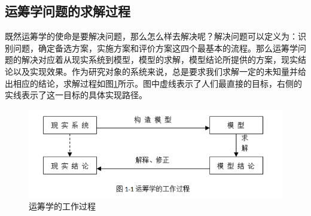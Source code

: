 \subsection{运筹学问题的求解过程}
\begin{frame}{\subsecname}
    既然运筹学的使命是要解决问题，那么怎么样去解决呢？解决问题可以定义为：识别问题，确定备选方案，实施方案和评价方案这四个最基本的流程。那么运筹学问题的解决对应着从现实系统到模型，模型的求解，模型结论所提供的方案，现实结论以及实现效果。作为研究对象的系统来说，总是要求我们求解一定的未知量并给出相应的结论，求解过程如图\ref{fig:ch1-1}所示。图中虚线表示了人们最直接的目标，右侧的实线表示了这一目标的具体实现路径。
\begin{figure}[htbp]\label{fig:ch1-1}
  \centering
  \includegraphics[width=5 in,height=2 in]{pic/1_1.png}
  \caption{运筹学的工作过程}
\end{figure}
\end{frame}

